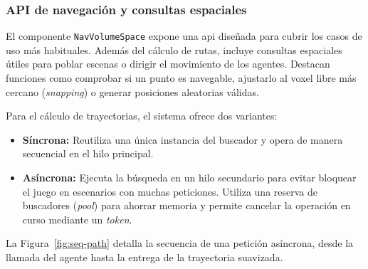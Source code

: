 \subsubsection{API de navegación y consultas espaciales}

El componente \texttt{NavVolumeSpace} expone una \acrshort{api} diseñada para cubrir los casos de uso más habituales.
Además del cálculo de rutas, incluye consultas espaciales útiles para poblar escenas o dirigir el movimiento de los agentes.
Destacan funciones como comprobar si un punto es navegable, ajustarlo al \gls{voxel} libre más cercano (\textit{snapping}) o generar posiciones aleatorias válidas.

Para el cálculo de trayectorias, el sistema ofrece dos variantes:

\begin{itemize}
  \item \textbf{Síncrona:} Reutiliza una única instancia del buscador y opera de manera secuencial en el hilo principal.
  \item \textbf{Asíncrona:} Ejecuta la búsqueda en un hilo secundario para evitar bloquear el juego en escenarios con muchas peticiones.
  Utiliza una reserva de buscadores (\textit{pool}) para ahorrar memoria y permite cancelar la operación en curso mediante un \textit{token}.
\end{itemize}

La Figura~\ref{fig:seq-path} detalla la secuencia de una petición asíncrona, desde la llamada del agente hasta la entrega de la trayectoria suavizada.

